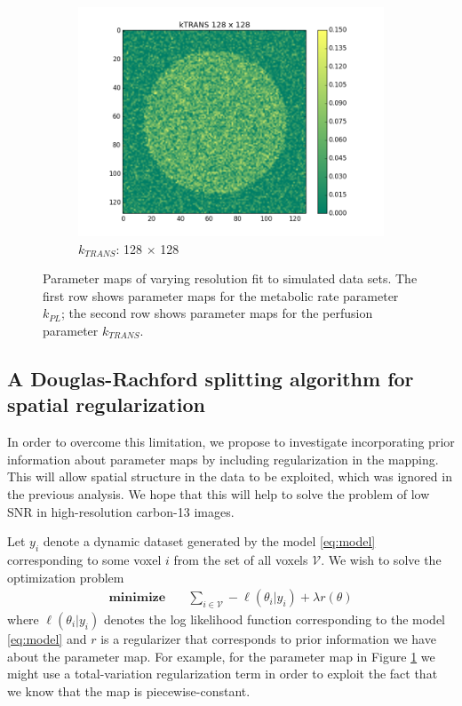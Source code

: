 \documentclass{article}
\begin{document}
\begin{figure}[ht!]
    \begin{subfigure}[b]{0.3\textwidth}
        \includegraphics[width=\textwidth]{figs/kTRANS_128.png}
        \caption{$k_{TRANS}$: 128 $\times$ 128}
    \end{subfigure}
    \caption{Parameter maps of varying resolution fit to simulated data sets. The first row shows parameter maps for the metabolic rate parameter $k_{PL}$; the second row shows parameter maps for the perfusion parameter $k_{TRANS}$. }\label{fig:effect_of_resolution}
\end{figure}

\subsection{A Douglas-Rachford splitting algorithm for spatial regularization} 
In order to overcome this limitation, we propose to investigate incorporating prior information about parameter maps by including regularization in the mapping. This will allow spatial structure in the data to be exploited, which was ignored in the previous analysis. We hope that this will help to solve the problem of low SNR in high-resolution carbon-13 images. 

Let $y_i$ denote a dynamic dataset generated by the model \eqref{eq:model} corresponding to some voxel $i$ from the set of all voxels $\mathcal{V}$. We wish to solve the optimization problem  
\[
\begin{split}
\textbf{minimize} & \quad  \sum_{i \in \mathcal{V}} -\ell(\theta_i | y_i) + \lambda r(\theta) 
\end{split} 
\label{eq:opt}
\]
where $\ell(\theta_i | y_i)$ denotes the log likelihood function corresponding to the model \eqref{eq:model} and $r$ is a regularizer that corresponds to prior information we have about the parameter map. For example, for the parameter map in Figure \ref{fig:effect_of_resolution} we might use a total-variation regularization term in order to exploit the fact that we know that the map is piecewise-constant. 
\end{document}

